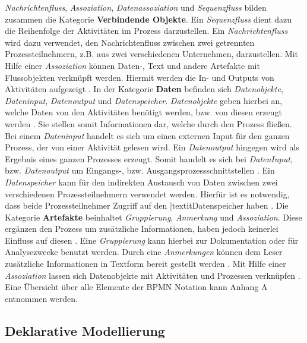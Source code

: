 \textit{Nachrichtenfluss}, \textit{Assoziation}, \textit{Datenassoziation} und \textit{Sequenzfluss} bilden zusammen die Kategorie \textbf{Verbindende Objekte}. Ein \textit{Sequenzfluss} dient dazu die Reihenfolge der Aktivitäten im Prozess darzustellen. Ein \textit{Nachrichtenfluss} wird dazu verwendet, den Nachrichtenfluss zwischen zwei getrennten Prozessteilnehmern, z.B. aus zwei verschiedenen Unternehmen, darzustellen. Mit Hilfe einer \textit{Assoziation} können Daten-, Text und andere Artefakte mit Flussobjekten verknüpft werden. Hiermit werden die In- und Outputs von Aktivitäten aufgezeigt \cite{white2004}. \newline
In der Kategorie \textbf{Daten} befinden sich \textit{Datenobjekte}, \textit{Dateninput}, \textit{Datenoutput} und \textit{Datenspeicher}. \textit{Datenobjekte} geben hierbei an, welche Daten von den Aktivitäten benötigt werden, bzw. von diesen erzeugt werden \cite{white2004}. Sie stellen somit Informationen dar, welche durch den Prozess fließen. Bei einem  \textit{Dateninput} handelt es sich um einen externen Input für den ganzen Prozess, der von einer Aktivität gelesen wird. Ein \textit{Datenoutput} hingegen wird als Ergebnis eines ganzen Prozesses erzeugt. Somit handelt es sich bei \textit{DatenInput}, bzw. \textit{Datenoutput} um Eingangs-, bzw. Ausgangsprozessschnittstellen \cite{bpmnposter}. Ein \textit{Datenspeicher} kann für den indirekten Austausch von Daten zwischen zwei verschiedenen Prozessteilnehmern verwendet werden. Hierfür ist es notwendig, dass beide Prozessteilnehmer Zugriff auf den |textit{Datenspeicher} haben \cite{allweyer2013}.\newline
Die Kategorie \textbf{Artefakte} beinhaltet \textit{Gruppierung}, \textit{Anmerkung} und \textit{Assoziation}.  Diese ergänzen den Prozess um zusätzliche Informationen, haben jedoch keinerlei Einfluss auf diesen \cite{gpfert2012}. Eine \textit{Gruppierung} kann hierbei zur Dokumentation oder für Analysezwecke benutzt werden. Durch eine \textit{Anmerkungen} können dem Leser zusätzliche Informationen in Textform bereit gestellt werden \cite{white2004}. Mit Hilfe einer \textit{Assoziation} lassen sich Datenobjekte mit Aktivitäten und Prozessen verknüpfen \cite{bpmnposter}. \newline
 Eine Übersicht über alle Elemente der BPMN Notation kann Anhang A entnommen werden.\newline





\subsection{Deklarative Modellierung}

